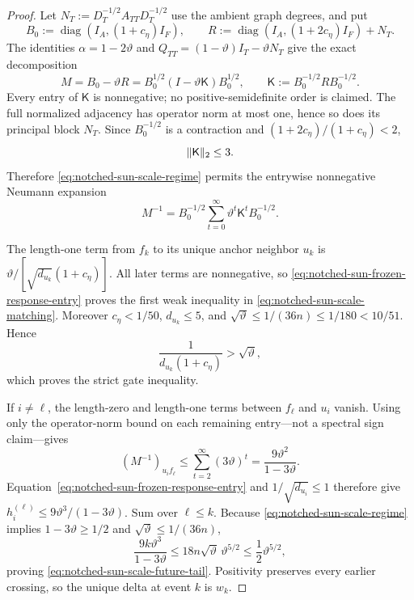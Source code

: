 \begin{proof}
Let $N_T:=D_T^{-1/2}A_{TT}D_T^{-1/2}$ use the ambient graph degrees, and put
\begin{equation}
 B_0:=\operatorname{diag}(I_A,(1+c_\eta)I_F),
 \qquad
 R:=\operatorname{diag}(I_A,(1+2c_\eta)I_F)+N_T.
 \label{eq:notched-sun-scale-blocks}
\end{equation}
The identities $\alpha=1-2\vartheta$ and
$Q_{TT}=(1-\vartheta)I_T-\vartheta N_T$ give the exact decomposition
\begin{equation}
 M=B_0-\vartheta R
 =B_0^{1/2}(I-\vartheta\mathsf K)B_0^{1/2},
 \qquad
 \mathsf K:=B_0^{-1/2}RB_0^{-1/2}.
 \label{eq:notched-sun-scale-neumann-decomposition}
\end{equation}
Every entry of $\mathsf K$ is nonnegative; no positive-semidefinite order is
claimed.  The full normalized adjacency has operator norm at most one, hence
so does its principal block $N_T$.  Since $B_0^{-1/2}$ is a contraction and
$(1+2c_\eta)/(1+c_\eta)<2$,
\begin{equation*}
 \lVert\mathsf K\rVert_2\leq3.
\end{equation*}
Therefore \cref{eq:notched-sun-scale-regime} permits the entrywise
nonnegative Neumann expansion
\begin{equation}
 M^{-1}
 =B_0^{-1/2}\sum_{t=0}^{\infty}
   \vartheta^t\mathsf K^tB_0^{-1/2}.
 \label{eq:notched-sun-scale-neumann-series}
\end{equation}

The length-one term from $f_k$ to its unique anchor neighbor $u_k$ is
$\vartheta/[\sqrt{d_{u_k}}(1+c_\eta)]$.  All later terms are nonnegative, so
\cref{eq:notched-sun-frozen-response-entry} proves the first weak inequality
in \cref{eq:notched-sun-scale-matching}.  Moreover
$c_\eta<1/50$, $d_{u_k}\leq5$, and
$\sqrt\vartheta\leq1/(36n)\leq1/180<10/51$.  Hence
\begin{equation*}
 \frac1{d_{u_k}(1+c_\eta)}>\sqrt\vartheta,
\end{equation*}
which proves the strict gate inequality.

If $i\neq\ell$, the length-zero and length-one terms between $f_\ell$ and
$u_i$ vanish.  Using only the operator-norm bound on each remaining
entry---not a spectral sign claim---gives
\begin{equation*}
 (M^{-1})_{u_if_\ell}
 \leq\sum_{t=2}^{\infty}(3\vartheta)^t
 =\frac{9\vartheta^2}{1-3\vartheta}.
\end{equation*}
Equation~\eqref{eq:notched-sun-frozen-response-entry} and
$1/\sqrt{d_{u_i}}\leq1$ therefore give
$h_i^{(\ell)}\leq9\vartheta^3/(1-3\vartheta)$.  Sum over
$\ell\leq k$.  Because \cref{eq:notched-sun-scale-regime} implies
$1-3\vartheta\geq1/2$ and
$\sqrt\vartheta\leq1/(36n)$,
\begin{equation*}
 \frac{9k\vartheta^3}{1-3\vartheta}
 \leq18n\sqrt\vartheta\,\vartheta^{5/2}
 \leq\frac12\vartheta^{5/2},
\end{equation*}
proving \cref{eq:notched-sun-scale-future-tail}.  Positivity preserves every
earlier crossing, so the unique delta at event $k$ is $w_k$.


\end{proof}
